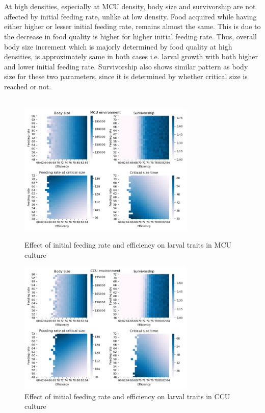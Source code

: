\\ \\
At high densities, especially at MCU density, body size and survivorship are not affected by initial feeding rate, unlike at low density. Food acquired while having either higher or lesser initial feeding rate, remains almost the same. This is due to the decrease in food quality is higher for higher initial feeding rate. Thus, overall body size increment which is majorly determined by food quality at high densities, is approximately same in both cases i.e. larval growth with both higher and lower initial feeding rate. Survivorship also shows similar pattern as body size for these two parameters, since it is determined by whether critical size is reached or not.\\ \\
\begin{figure}[!tbp]
  \centering
  \includegraphics[width=0.75\textwidth]{C3/Figs/Feeding_rate_vs_Efficiency_MCU}
  \caption{Effect of initial feeding rate and efficiency on larval traits in MCU culture}
  \label{fig:fr vs eff mcu}
  \vspace{24pt}
  \includegraphics[width=0.75\textwidth]{C3/Figs/Feeding_rate_vs_Efficiency_CCU}
  \caption{Effect of initial feeding rate and efficiency on larval traits in CCU culture}
  \label{fig:fr vs eff ccu}
\end{figure}
\newpage

